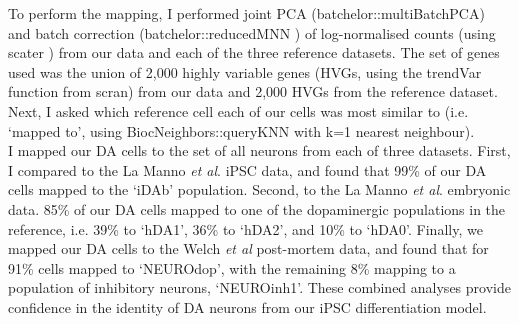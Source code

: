 To perform the mapping, I performed joint PCA (batchelor::multiBatchPCA) 
and batch correction (batchelor::reducedMNN \cite{haghverdi2018batch}) of log-normalised counts (using scater \cite{mccarthy2017scater}) from our data and each of the three reference datasets. 
The set of genes used was the union of 2,000 highly variable genes (HVGs, using the trendVar function from scran) 
from our data and 2,000 HVGs from the reference dataset. 
Next, I asked which reference cell each of our cells was most similar to (i.e. ‘mapped to', using BiocNeighbors::queryKNN with k=1 nearest neighbour).\\

I mapped our DA cells to the set of all neurons from each of three datasets.
First, I compared to the La Manno \textit{et al}. iPSC data, and found that
99\% of our DA cells mapped to the `iDAb' population.
Second, to the La Manno \textit{et al}. embryonic data. 
85\% of our DA cells mapped to one of the dopaminergic populations in the reference, i.e. 39\% to `hDA1', 36\% to `hDA2', and 10\% to `hDA0'.
Finally, we mapped our DA cells to the Welch \textit{et al} post-mortem data, and found that for 91\% cells mapped to `NEUROdop', with the remaining 8\% mapping to a population of inhibitory neurons, `NEUROinh1'.
These combined analyses provide confidence in the identity of DA neurons from our iPSC differentiation model.







